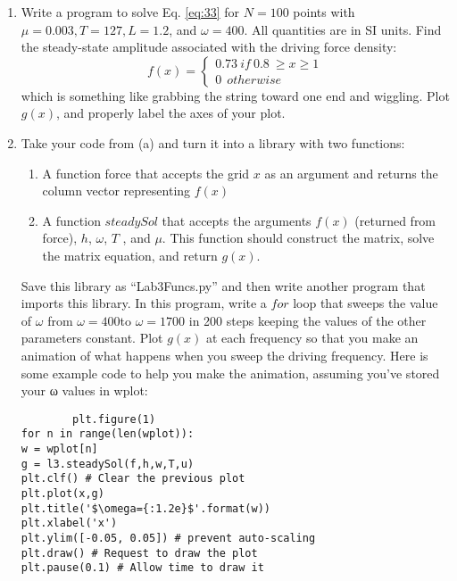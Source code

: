 \begin{problem} \label{P3.2}
\begin{enumerate}[label=(\alph*)]
	\item Write a program to solve Eq. \ref{eq:33} for $N = 100$ points with $ \mu = 0.003,
T = 127, L = 1.2$, and $\omega = 400$. All quantities are in SI units. Find the
steady-state amplitude associated with the driving force density:
\begin{equation}\label{eq:34}
		f(x) = 
		\begin{cases}
		0.73 \ if \ 0.8 \	\geq x 	\geq 1 \\
		0 \ \ otherwise
		\end{cases}
				\end{equation}which is something like grabbing the string toward one end and wiggling. Plot $g(x)$, and properly label the axes of your plot.
				\item Take your code from (a) and turn it into a library with two functions:
				\begin{enumerate}
				\item	A function force that accepts the grid $x$ as an argument and
returns the column vector representing $f(x)$

\item A function $steadySol$ that accepts the arguments $f(x)$ (returned
from force), $h$, $\omega$, $T$ , and $\mu$. This function should construct the
matrix, solve the matrix equation, and return $g(x)$.
\end{enumerate}


Save this library as “Lab3Funcs.py” and then write another program
that imports this library. In this program, write a $for$ loop that sweeps
the value of $\omega$ from $\omega = 400$to $\omega = 1700$ in 200 steps keeping the
values of the other parameters constant. Plot $g(x)$ at each frequency
so that you make an animation of what happens when you sweep the
driving frequency. Here is some example code to help you make the
animation, assuming you\rq ve stored your ω values in wplot:
		\begin{lstlisting}
		plt.figure(1)
for n in range(len(wplot)):
w = wplot[n]
g = l3.steadySol(f,h,w,T,u)
plt.clf() # Clear the previous plot
plt.plot(x,g)
plt.title('$\omega={:1.2e}$'.format(w))
plt.xlabel('x')
plt.ylim([-0.05, 0.05]) # prevent auto-scaling
plt.draw() # Request to draw the plot
plt.pause(0.1) # Allow time to draw it
		

\end{lstlisting}
\end{enumerate}
\end{problem}
